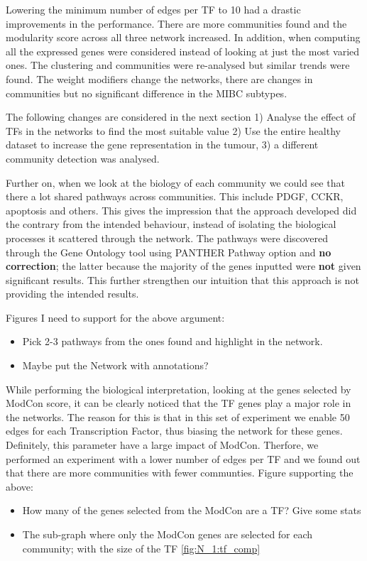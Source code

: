 Lowering the minimum number of edges per TF to 10 had a drastic improvements in the performance. There are more communities found and the modularity score across all three network increased. In addition, when computing all the expressed genes were considered instead of looking at just the most varied ones. The clustering and communities were re-analysed but similar trends were found. The weight modifiers change the networks, there are changes in communities but no significant difference in the MIBC subtypes. 

The following changes are considered in the next section 1) Analyse the effect of TFs in the networks to find the most suitable value 2) Use the entire healthy dataset to increase the gene representation in the tumour,  3) a different community detection was analysed.



\newpage


Further on, when we look at the biology of each community we could see that there a lot shared pathways across communities. This include PDGF, CCKR, apoptosis and others. This gives the impression that the approach developed did the contrary from the intended behaviour, instead of isolating the biological processes it scattered through the network. The pathways were discovered through the Gene Ontology tool using PANTHER Pathway option and \textbf{no correction}; the latter because the majority of the genes inputted were \textbf{not} given significant results. This further strengthen our intuition that this approach is not providing the intended results.

Figures I need to support for the above argument:
\begin{itemize}
    \item Pick 2-3 pathways from the ones found and highlight in the network.
    \item Maybe put the Network with annotations?
\end{itemize}

While performing the biological interpretation, looking at the genes selected by ModCon score, it can be clearly noticed that the TF genes play a major role in the networks. The reason for this is that in this set of experiment we enable 50 edges for each Transcription Factor, thus biasing the network for these genes. Definitely, this parameter have a large impact of ModCon. Therfore, we performed an experiment with a lower number of edges per TF and we found out that there are more communities with fewer communties.
Figure supporting the above:
\begin{itemize}
    \item How many of the genes selected from the ModCon are a TF? Give some stats
    \item The sub-graph where only the ModCon genes are selected for each community; with the size of the TF \ref{fig:N_1:tf_comp}
\end{itemize}

